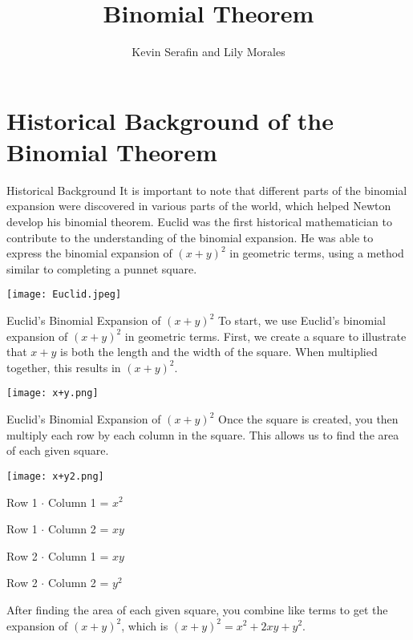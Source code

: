 \documentclass{beamer}
\title{Binomial Theorem}
\author{Kevin Serafin and Lily Morales}
\institute{CSU Fullerton}
\theoremstyle{plain}
\theoremstyle{definition}
\theoremstyle{remark}
\begin{document}
\begin{frame}
 \titlepage
\end{frame}

\section{Historical Background of the Binomial Theorem}

\begin{frame}{Historical Background} 
It is important to note that different parts of the binomial expansion were discovered in various parts of the world, which helped Newton develop his binomial theorem. Euclid was the first historical mathematician to contribute to the understanding of the binomial expansion. He was able to express the binomial expansion of \( (x+y)^2 \) in geometric terms, using a method similar to completing a punnet square.

\begin{center}
    \texttt{[image: Euclid.jpeg]}
\end{center}
\end{frame}

\begin{frame}{Euclid's Binomial Expansion of \((x+y)^2\)}
To start, we use Euclid's binomial expansion of \((x+y)^2\) in geometric terms. First, we create a square to illustrate that \(x+y\) is both the length and the width of the square. When multiplied together, this results in \((x+y)^2\).

\begin{center}
    \texttt{[image: x+y.png]}
\end{center}
\end{frame}



\begin{frame}{Euclid's Binomial Expansion of \((x+y)^2\)}
Once the square is created, you then multiply each row by each column in the square. This allows us to find the area of each given square.

\begin{center}
    \texttt{[image: x+y2.png]}
\end{center}

\vspace{0.2cm}
Row 1 $\cdot$ Column 1 = $x^2$

\vspace{0.2cm}
Row 1 $\cdot$ Column 2 = $xy$

\vspace{0.2cm}
Row 2 $\cdot$ Column 1 = $xy$

\vspace{0.2cm}
Row 2 $\cdot$ Column 2 = $y^2$

\vspace{0.2cm}
After finding the area of each given square, you combine like terms to get the expansion of \((x+y)^2\), which is \((x+y)^2 = x^2 + 2xy + y^2\).
\end{frame}
\end{document}
